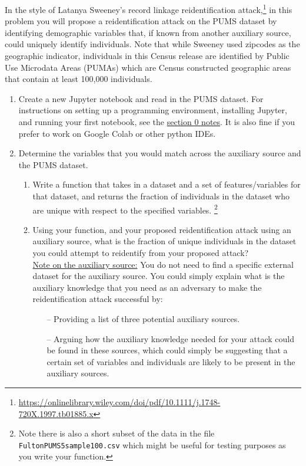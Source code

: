 \documentclass[11pt]{article}
\begin{document}
\begin{enumerate}[leftmargin=*]
In the style of Latanya Sweeney's record linkage reidentification attack,\footnote{\url{https://onlinelibrary.wiley.com/doi/pdf/10.1111/j.1748-720X.1997.tb01885.x}} in this problem you will propose a reidentification attack on the PUMS dataset by identifying demographic variables that, if known from another auxiliary source, could uniquely identify individuals.  Note that while Sweeney used zipcodes as the geographic indicator, individuals in this Census release are identified by Public Use Microdata Areas (PUMAs) which are Census constructed geographic areas that contain at least 100,000 individuals. 

\begin{enumerate}
    \item Create a new Jupyter notebook and read in the PUMS dataset. For instructions on setting up a programming environment, installing Jupyter, and running your first notebook, see the \href{https://github.com/opendp/cs208/blob/main/spring2025/sections/section0-programming.pdf}{section 0 notes}. It is also fine if you prefer to work on Google Colab or other python IDEs. 

    \item Determine the variables that you would match across the auxiliary source and the PUMS dataset. 
 
    \begin{enumerate}

        \item Write a function that takes in a dataset and a set of features/variables for that dataset, and returns the fraction of individuals in the dataset who are unique with respect to the specified variables. \footnote{Note there is also a short subset of the data in the file \texttt{FultonPUMS5sample100.csv} which might be useful for testing purposes as you write your function.}
        \item Using your function, and your proposed reidentification attack using an auxiliary source, what is the fraction of unique individuals in the dataset you could attempt to reidentify from your proposed attack?  \\

        \underline{Note on the auxiliary source:} You do not need to find a specific external dataset for the auxiliary source. You could simply explain what is the auxiliary knowledge that you need as an adversary to make the reidentification attack successful by:
        \begin{itemize}
            \item[--] Providing a list of three potential auxiliary sources.
            \item[--] Arguing how the auxiliary knowledge needed for your attack could be found in these sources, which could simply be suggesting that a certain set of variables and individuals are likely to be present in the auxiliary sources.\\
        \end{itemize}
        

\end{enumerate}
\end{enumerate}
\end{enumerate}
\end{document}

